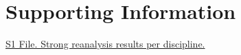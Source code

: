 \section*{Supporting Information}

\href{https://github.com/chartgerink/2015head/raw/master/submission/S1%20Strong%20reanalysis%20results%20per%20discipline.xlsx}{S1 File. Strong reanalysis results per discipline.}